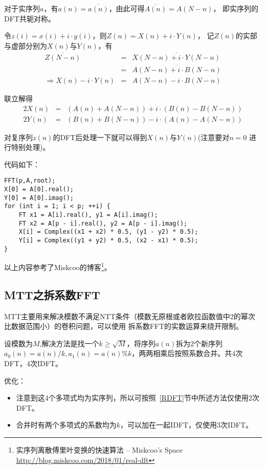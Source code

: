 对于实序列$a$，有$a(n)=\overline{a(n)}$，由此可得$\overline{A(n)}=A(N-n)$，
即实序列的DFT共轭对称。

令$z(i)=x(i)+i\cdot y(i)$，则$Z(n)=X(n)+i\cdot Y(n)$，
记$Z(n)$的实部与虚部分别为$X(n)$与$Y(n)$，有
\begin{eqnarray*}
	\overline{Z(N-n)}&=&\overline{X(N-n)+i\cdot Y(N-n)}\\
	&=&\overline{A(N-n)+i\cdot B(N-n)}\\
	\Rightarrow X(n)-i\cdot Y(n)&=&A(N-n)-i\cdot B(N-n)
\end{eqnarray*}

联立解得
\begin{eqnarray*}
	2X(n)&=&(A(n)+A(N-n))+i\cdot (B(n)-B(N-n))\\
	2Y(n)&=&(B(n)+B(N-n))-i\cdot (A(n)-A(N-n))
\end{eqnarray*}

对复序列$z(n)$的DFT后处理一下就可以得到$X(n)$与$Y(n)$(注意要对$n=0$
进行特别处理)。

代码如下：
\begin{lstlisting}
FFT(p,A,root);
X[0] = A[0].real();
Y[0] = A[0].imag();
for (int i = 1; i < p; ++i) {
	FT x1 = A[i].real(), y1 = A[i].imag();
	FT x2 = A[p - i].real(), y2 = A[p - i].imag();
	X[i] = Complex((x1 + x2) * 0.5, (y1 - y2) * 0.5);
	Y[i] = Complex((y1 + y2) * 0.5, (x2 - x1) * 0.5);
}
\end{lstlisting}

以上内容参考了Miskcoo的博客\footnote{实序列离散傅里叶变换的快速算法 – Miskcoo's Space
\url{http://blog.miskcoo.com/2018/01/real-dft}}。
\subsection{MTT之拆系数FFT}
MTT主要用来解决模数不满足NTT条件（模数无原根或者欧拉函数值中2的幂次比数据范围小）的卷积问题，可以使用
拆系数FFT的实数运算来绕开限制。

设模数为$M$,解决方法是找一个$k\geq\sqrt{M}$，将序列$a(n)$拆为2个新序列
$a_0(n)=a(n)/k,a_1(n)=a(n)\% k$，两两相乘后按照系数合并。共4次DFT，4次IDFT。

优化：
\begin{itemize}
	\item 注意到这4个多项式均为实序列，所以可按照~\ref{RDFT}节中所述方法仅使用2次DFT。
	\item 合并时有两个多项式的系数均为$k$，可以加在一起IDFT，仅使用3次IDFT。
\end{itemize}
